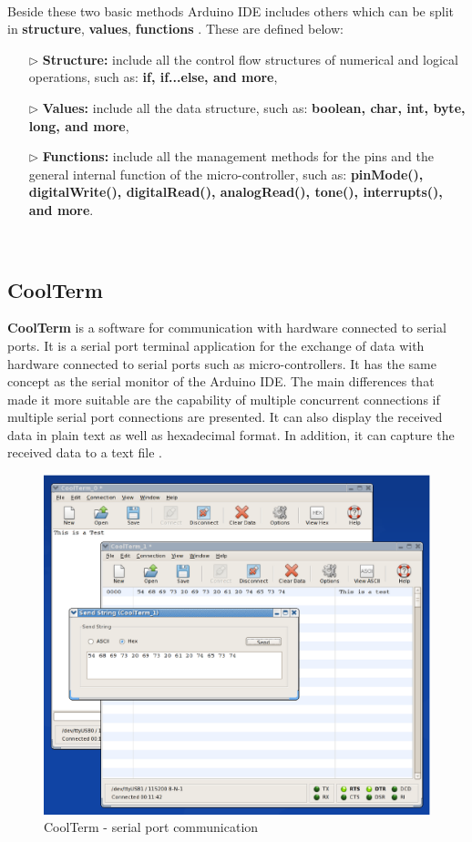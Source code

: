 \documentclass[12pt,a4paper]{report}
\begin{document}
\ \\
Beside these two basic methods Arduino IDE includes others which can be split in \textbf{structure}, \textbf{values}, \textbf{functions} \cite{website:arduinosoftware}. These are defined below: 
\begin{itemize}
    \item[$\triangleright$] \textbf{Structure:} include all the control flow structures of numerical and logical operations, such as: \textbf{if, if...else, and more}, 
    \item[$\triangleright$] \textbf{Values:} include all the data structure, such as: \textbf{boolean, char, int, byte, long, and more},
    \item[$\triangleright$] \textbf{Functions:} include all the management methods for the pins and the general internal function of the micro-controller, such as: \textbf{pinMode(), digitalWrite(), digitalRead(), analogRead(), tone(), interrupts(), and more}.
\end{itemize}
\ \\
%
\subsection{CoolTerm}
\textbf{CoolTerm} is a software for communication with hardware connected to serial ports. It is a serial port terminal application for the exchange of data with hardware connected to serial ports  such as micro-controllers. It has the same concept as the serial monitor of the Arduino IDE. The main differences that made it more suitable are the capability of multiple concurrent connections if multiple serial port connections are presented. It can also display the received data in plain text as well as hexadecimal format. In addition, it can capture the received data to a text file \cite{website:coolterm}.
\begin{figure}[H]
\centering
    \includegraphics*[scale=0.3]{cooltermtinux}
    \caption{CoolTerm - serial port communication}
\end{figure}
\ \\
%
\end{document}
